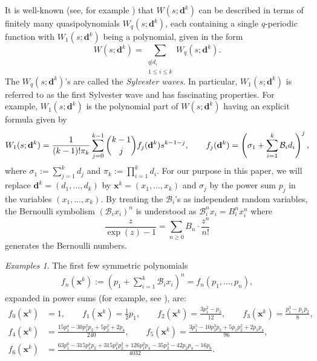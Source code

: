 \documentclass[11pt]{amsart}
\theoremstyle{definition}
\theoremstyle{remark}
\newtheorem*{examples}{Examples}
\numberwithin{equation}{section}
\begin{document}
\smallskip
It is well-known (see, for example \cite[Section 3.1]{fl17}) that $W(s;\pmb{d}^k)$ can be described in terms of finitely many quasipolynomials $W_q(s;\pmb{d}^k)$, each containing a single $q$-periodic function with $W_1(s;\pmb{d}^k)$ being a polynomial, given in the form
$$W(s;\pmb{d}^k)=\sum_{\substack{ q\vert d_i \\ 1\leq i\leq k}} W_q(s;\pmb{d}^k).$$
The $W_q(s;\pmb{d}^k)$'s are called the \emph{Sylvester waves}. In particular, $W_1(s;\pmb{d}^k)$ is referred to as the first Sylvester wave and has fascinating properties. For example, $W_1(s;\pmb{d}^k)$ is the polynomial part of 
$W(s;\pmb{d}^k)$ having an explicit formula \cite[(3.16) and (7.1)]{fl17} given by
\begin{align} \label{W1_f}
W_1(s;{\bf d}^k)=\frac1{(k-1)!\pi_k}\sum_{j=0}^{k-1} \binom{k-1}j f_j({\bf d}^k)s^{k-1-j},\qquad f_j({\bf d}^k)=\left(\sigma_1+\sum_{i=1}^k \mathcal{B}_id_i\right)^j,
\end{align}
where $\sigma_1:=\sum_{j=1}^kd_j$ and $\pi_k:=\prod_{i=1}^kd_i$. For our purpose in this paper, we will replace $\pmb{d}^k=(d_1,\dots,d_k)$ by $\pmb{x}^k=(x_1,\dots,x_k)$ and $\sigma_j$ by the power sum $p_j$ in the variables $(x_1,\dots,x_k)$.
 By treating the $\mathcal{B}_i$'s as independent random variables, the Bernoulli symbolism $(\mathcal{B}_ix_i)^n$ is understood as $\mathcal{B}_i^nx_i=B_i^nx_i^n$ where 
$$\frac{z}{\exp(z)-1}=\sum_{n\geq0} B_n\cdot \frac{z^n}{n!}
$$
generates the Bernoulli numbers.



\begin{examples}
The first few symmetric polynomials 
\begin{align} \label{black} f_n(\pmb{x}^k):=\left(p_1+\sum_{i=1}^k
\mathcal{B}_ix_i\right)^n
=f_n(p_1,\ldots,p_n), \end{align}
expanded in power sums (for example, see \cite[(7.2)]{fl17}), are:
\begin{align*}
f_0(\pmb{x}^k)&=1, \qquad
f_1(\pmb{x}^k) = \frac12p_1, \qquad
f_2(\pmb{x}^k) = \frac{3p_1^2-p_2}{12}, \qquad
f_3(\pmb{x}^k) = \frac{p_1^3 -p_1p_2}8, \\
f_4(\pmb{x}^k)& = \frac{15p_1^4 -30p_1^2p_2+5p_2^2 +2p_4}{240}, \qquad
f_5(\pmb{x}^k) = \frac{3p_1^5-10p_1^3p_2+5p_1p_2^2 +2p_1p_4}{96}, \\
f_6(\pmb{x}^k)& = \frac{63p_1^6 -315p_1^4p_2+315p_1^2p_2^2 +126p_1^2p_4-35p_2^3-42p_2p_4 -16p_6}{4032}.
\end{align*}
\end{examples}
\end{document}
